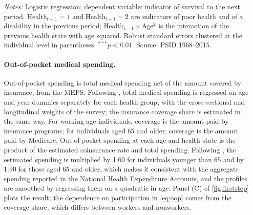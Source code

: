 \begin{table}[!htbp]
\centering
\caption{Estimated Coefficients of the Survival Logit}
\label{tab:survival}
\vspace{6pt}
\footnotesize
\begin{threeparttable}

\begin{tablenotes}[flushleft]\scriptsize
\item[] \textit{Notes:} Logistic regression; dependent variable: indicator of survival to the next period. Health$_{t-1}=1$ and Health$_{t-1}=2$ are indicators of poor health and of a disability in the previous period; Health$_{t-1}\times$Age$^2$ is the interaction of the previous health state with age squared. Robust standard errors clustered at the individual level in parentheses. $^{***}p<0.01$. Source: PSID 1968--2015.
\end{tablenotes}
\end{threeparttable}
\end{table}

\paragraph{Out-of-pocket medical spending.}
Out-of-pocket spending is total medical spending net of the amount covered by insurance, from the MEPS. %
Following \citet{Pashchenko2019}, total medical spending is regressed on age and year dummies separately for each health group, with the cross-sectional and longitudinal weights of the survey; the insurance coverage share is estimated in the same way. %
For working-age individuals, coverage is the amount paid by insurance programs; for individuals aged 65 and older, coverage is the amount paid by Medicare. %
Out-of-pocket spending at each age and health state is the product of the estimated coinsurance rate and total spending. %
Following \citet{Denardi2018}, the estimated spending is multiplied by 1.60 for individuals younger than 65 and by 1.90 for those aged 65 and older, which makes it consistent with the aggregate spending reported in the National Health Expenditure Accounts, and the profiles are smoothed by regressing them on a quadratic in age. %
Panel (C) of \autoref{fig:firststep} plots the result; the dependence on participation in \eqref{eq:oop} comes from the coverage share, which differs between workers and nonworkers. %

